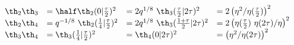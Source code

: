 \begin{equation}
  \begin{array}{llll}
\th_2  \th_3 &= \half  \th_2(0|{\tau\over 2})^2 &= 2 q^{1/8}~ \th_3({\tau\over 2}|2\tau)^2 &= 2 \left( \eta^2/\eta({\tau\over 2}) \right)^2 \\
    \th_2  \th_4 &= q^{-1/8}~\th_2({1\over 4}|{\tau\over 2})^2 &= 2 q^{1/8}~
    \th_3({1+\tau\over 2}|2\tau)^2 &= 2\left(\eta({\tau\over 2})~\eta(2\tau)/\eta \right)^2 \\
    \th_3 \th_4 &= \th_3({1\over 4}|{\tau\over 2})^2 &=
    \th_4(0|2\tau)^2 &= \left( \eta^2/\eta(2\tau) \right)^2 
  \end{array}
\end{equation}

